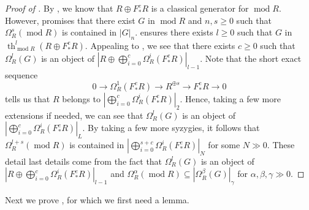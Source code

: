 \documentclass[11pt]{amsart}
\theoremstyle{plain}
\theoremstyle{definition}
\numberwithin{equation}{section}
\numberwithin{theorem}{section}
\begin{document}
\begin{proof}[Proof of ]
    By , we know that $R\oplus F_\ast^e R$ is a classical generator for $\operatorname{mod}R$. However,  promises that there exist $G$ in $ \operatorname{mod}R$ and $n,s \geq 0$ such that $\Omega^s_R (\operatorname{mod}R) $ is contained in $ |G|_n$.  ensures there exists $l\geq 0$ such that $G$ in $\operatorname{th}_{\operatorname{mod}R}^l (R\oplus F_\ast^e R)$. Appealing to , we see that there exists $c \geq 0$ such that $\Omega^l_R (G)$ is an object of $| R \oplus \bigoplus^c_{i=0} \Omega^i_R (F_\ast^e R) |_{l-1}$. Note that the short exact sequence
    \begin{displaymath}
        0 \to \Omega^1_R (F_\ast^e R) \to R^{\oplus s} \to F_\ast^e R \to 0
    \end{displaymath}
    tells us that $R$ belongs to $|\bigoplus^c_{i=0} \Omega^i_R (F_\ast^e R)|_2$. Hence, taking a few more extensions if needed, we can see that $\Omega^l_R (G)$ is an object of $|\bigoplus^c_{i=0} \Omega^i_R (F_\ast^e R) |_L$. By taking a few more syzygies, it follows that $\Omega^{l+s}_R (\operatorname{mod}R)$ is contained in $|\bigoplus^{s+c}_{i=0} \Omega^i_R (F_\ast^e R) |_N$ for some $N \gg 0$. These detail last details come from the fact that $\Omega^l_R (G)$ is an object of $| R \oplus \bigoplus^c_{i=0} \Omega^i_R (F_\ast^e R) |_{l-1}$ and $\Omega^\alpha_R (\operatorname{mod}R)\subseteq |\Omega^\beta_R (G) |_\gamma$ for $\alpha,\beta,\gamma\gg 0$.
\end{proof}


Next we prove  , for which we first need a lemma. 
\end{document}
